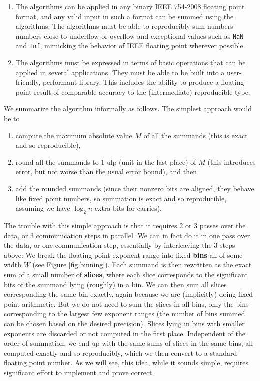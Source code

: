   \begin{enumerate}
    \item The algorithms can be applied in any binary IEEE 754-2008 floating point format, and any valid input in such a format can be summed using the algorithms. The algorithms must be able to reproducibly sum numbers numbers close to underflow or overflow and exceptional values such as \texttt{NaN} and \texttt{Inf}, mimicking the behavior of IEEE floating point wherever possible.
    \item The algorithms must be expressed in terms of basic operations that can be applied in several applications. They must be able to be built into a user-friendly, performant library. This includes the ability to produce a floating-point result of comparable accuracy to the (intermediate) reproducible type.
  \end{enumerate}

We summarize the algorithm informally as follows.
The simplest approach would be to
\begin{enumerate}
\item compute the maximum absolute value $M$ of all the
summands (this is exact and so reproducible),
\item round all the summands to 1 ulp (unit in the last
place) of $M$ (this introduces error, but not worse than
the usual error bound), and then
\item add the rounded summands (since their nonzero bits
are aligned, they behave like fixed point numbers, so
summation is exact and so reproducible, assuming we
have $\log_2 n$ extra bits for carries).
\end{enumerate}
The trouble with this simple approach is that it requires
2 or 3 passes over the data, or 3 communication steps in parallel.
We can in fact do it in one pass over the data, or one communication
step, essentially by interleaving the 3 steps above:
We break the floating point exponent range into fixed \textbf{bins} all of
some width $W$ (see Figure \ref{fig:binning}). Each summand is then rewritten as the
exact sum of a small number of \textbf{slices}, where each slice corresponds
to the significant bits of the summand lying (roughly) in a bin. We can then sum
all slices corresponding the same bin exactly, again because we are
(implicitly) doing fixed point arithmetic.  But we do not need
to sum the slices in all bins, only the bins corresponding to the largest
few exponent ranges (the number of bins summed can be chosen based on
the desired precision). Slices lying in bins with smaller exponents are
discarded or not computed in the first place. Independent of the order
of summation, we end up with the same sums of slices in the same bins, all computed exactly and
so reproducibly, which we then convert to a standard floating point number.
As we will see, this idea, while it sounds simple, requires significant effort
to implement and prove correct.

